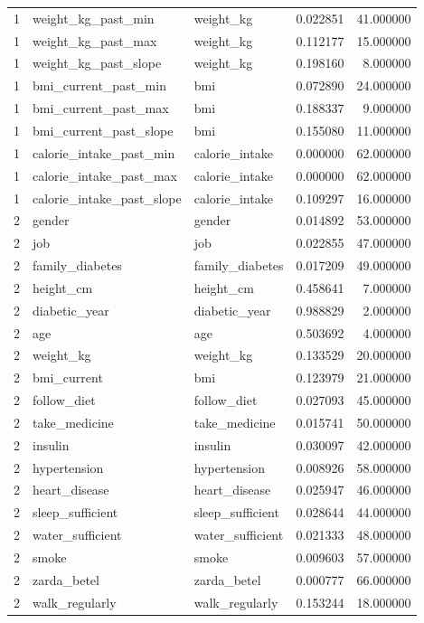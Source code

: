 \begin{longtable}{rllrr}
1 & weight\_kg\_past\_min & weight\_kg & 0.022851 & 41.000000 \\
1 & weight\_kg\_past\_max & weight\_kg & 0.112177 & 15.000000 \\
1 & weight\_kg\_past\_slope & weight\_kg & 0.198160 & 8.000000 \\
1 & bmi\_current\_past\_min & bmi & 0.072890 & 24.000000 \\
1 & bmi\_current\_past\_max & bmi & 0.188337 & 9.000000 \\
1 & bmi\_current\_past\_slope & bmi & 0.155080 & 11.000000 \\
1 & calorie\_intake\_past\_min & calorie\_intake & 0.000000 & 62.000000 \\
1 & calorie\_intake\_past\_max & calorie\_intake & 0.000000 & 62.000000 \\
1 & calorie\_intake\_past\_slope & calorie\_intake & 0.109297 & 16.000000 \\
2 & gender & gender & 0.014892 & 53.000000 \\
2 & job & job & 0.022855 & 47.000000 \\
2 & family\_diabetes & family\_diabetes & 0.017209 & 49.000000 \\
2 & height\_cm & height\_cm & 0.458641 & 7.000000 \\
2 & diabetic\_year & diabetic\_year & 0.988829 & 2.000000 \\
2 & age & age & 0.503692 & 4.000000 \\
2 & weight\_kg & weight\_kg & 0.133529 & 20.000000 \\
2 & bmi\_current & bmi & 0.123979 & 21.000000 \\
2 & follow\_diet & follow\_diet & 0.027093 & 45.000000 \\
2 & take\_medicine & take\_medicine & 0.015741 & 50.000000 \\
2 & insulin & insulin & 0.030097 & 42.000000 \\
2 & hypertension & hypertension & 0.008926 & 58.000000 \\
2 & heart\_disease & heart\_disease & 0.025947 & 46.000000 \\
2 & sleep\_sufficient & sleep\_sufficient & 0.028644 & 44.000000 \\
2 & water\_sufficient & water\_sufficient & 0.021333 & 48.000000 \\
2 & smoke & smoke & 0.009603 & 57.000000 \\
2 & zarda\_betel & zarda\_betel & 0.000777 & 66.000000 \\
2 & walk\_regularly & walk\_regularly & 0.153244 & 18.000000 \\

\end{longtable}
